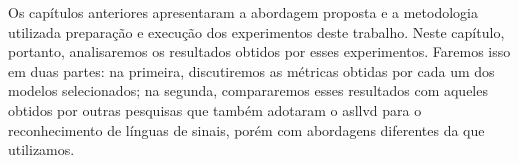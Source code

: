 Os capítulos anteriores apresentaram a abordagem proposta e a metodologia utilizada preparação e execução dos experimentos deste trabalho.
Neste capítulo, portanto, analisaremos os resultados obtidos por esses experimentos.
Faremos isso em duas partes: 
na primeira, discutiremos as métricas obtidas por cada um dos modelos selecionados; na segunda, compararemos esses resultados com aqueles obtidos por outras pesquisas que também adotaram o \acrfull{asllvd} para o reconhecimento de línguas de sinais, porém com abordagens diferentes da que utilizamos.
